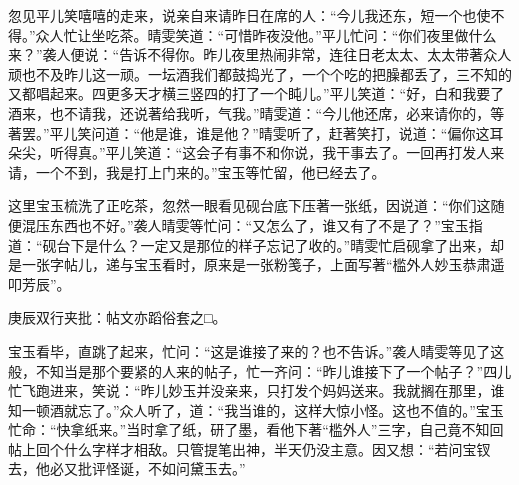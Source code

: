 \begin{parag}
    忽见平儿笑嘻嘻的走来，说亲自来请昨日在席的人：“今儿我还东，短一个也使不得。”众人忙让坐吃茶。晴雯笑道：“可惜昨夜没他。”平儿忙问：“你们夜里做什么来？”袭人便说：“告诉不得你。昨儿夜里热闹非常，连往日老太太、太太带著众人顽也不及昨儿这一顽。一坛酒我们都鼓捣光了，一个个吃的把臊都丢了，三不知的又都唱起来。四更多天才横三竖四的打了一个盹儿。”平儿笑道：“好，白和我要了酒来，也不请我，还说著给我听，气我。”晴雯道：“今儿他还席，必来请你的，等著罢。”平儿笑问道：“他是谁，谁是他？”晴雯听了，赶著笑打，说道：“偏你这耳朵尖，听得真。”平儿笑道：“这会子有事不和你说，我干事去了。一回再打发人来请，一个不到，我是打上门来的。”宝玉等忙留，他已经去了。
\end{parag}


\begin{parag}
    这里宝玉梳洗了正吃茶，忽然一眼看见砚台底下压著一张纸，因说道：“你们这随便混压东西也不好。”袭人晴雯等忙问：“又怎么了，谁又有了不是了？”宝玉指道：“砚台下是什么？一定又是那位的样子忘记了收的。”晴雯忙启砚拿了出来，却是一张字帖儿，递与宝玉看时，原来是一张粉笺子，上面写著“槛外人妙玉恭肃遥叩芳辰”。\begin{note}庚辰双行夹批：帖文亦蹈俗套之□。\end{note}宝玉看毕，直跳了起来，忙问：“这是谁接了来的？也不告诉。”袭人晴雯等见了这般，不知当是那个要紧的人来的帖子，忙一齐问：“昨儿谁接下了一个帖子？”四儿忙飞跑进来，笑说：“昨儿妙玉并没亲来，只打发个妈妈送来。我就搁在那里，谁知一顿酒就忘了。”众人听了，道：“我当谁的，这样大惊小怪。这也不值的。”宝玉忙命：“快拿纸来。”当时拿了纸，研了墨，看他下著“槛外人”三字，自己竟不知回帖上回个什么字样才相敌。只管提笔出神，半天仍没主意。因又想：“若问宝钗去，他必又批评怪诞，不如问黛玉去。”
\end{parag}



